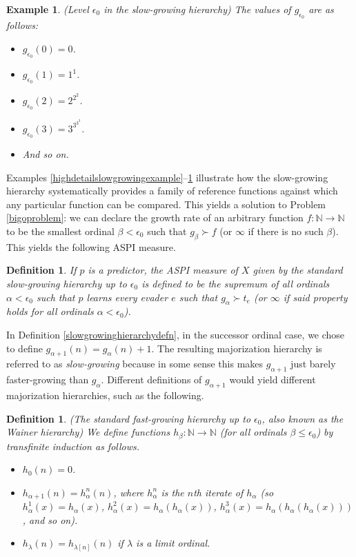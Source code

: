 \documentclass{article}
\newtheorem{definition}[theorem]{Definition}
\newtheorem{example}[theorem]{Example}
\begin{document}
\begin{example}
\label{epsilon0example}
(Level $\epsilon_0$ in the slow-growing hierarchy)
The values of $g_{\epsilon_0}$ are as follows:
\begin{itemize}
    \item
    $g_{\epsilon_0}(0)=0$.
    \item
    $g_{\epsilon_0}(1)=1^1$.
    \item
    $g_{\epsilon_0}(2)=2^{2^2}$.
    \item
    $g_{\epsilon_0}(3)=3^{3^{3^3}}$.
    \item
    And so on.
\end{itemize}
\end{example}

Examples \ref{highdetailslowgrowingexample}--\ref{epsilon0example} illustrate
how the slow-growing hierarchy systematically provides a family of reference
functions against which any particular function can be compared.
This yields a solution to Problem \ref{bigoproblem}: we can declare the growth
rate of an arbitrary function $f:\mathbb N\to\mathbb N$ to be the smallest ordinal
$\beta< \epsilon_0$ such that $g_\beta\succ f$ (or $\infty$ if there is no such
$\beta$). This yields the following ASPI measure.

\begin{definition}
\label{tradmajorizationhierarchyhibbardmeasuredefn}
    If $p$ is a predictor, the \emph{ASPI measure of $X$ given by the
    standard slow-growing hierarchy up to $\epsilon_0$} is defined to be the
    supremum of all ordinals $\alpha<\epsilon_0$ such that
    $p$ learns every evader $e$ such that $g_\alpha\succ t_e$ (or
    $\infty$ if said property holds for all ordinals $\alpha<\epsilon_0$).
\end{definition}

In Definition \ref{slowgrowinghierarchydefn}, in the successor ordinal case,
we chose to define $g_{\alpha+1}(n)=g_\alpha(n)+1$. The resulting majorization
hierarchy is referred to as \emph{slow-growing} because in some sense this
makes $g_{\alpha+1}$ just barely faster-growing than $g_\alpha$.
Different definitions of $g_{\alpha+1}$ would yield different majorization
hierarchies, such as the following.

\begin{definition}
\label{fastgrowinghierarchydefn}
    (The standard fast-growing hierarchy up to $\epsilon_0$, also known as
    the Wainer hierarchy)
    We define functions $h_\beta:\mathbb N\to\mathbb N$ (for all ordinals
    $\beta\leq \epsilon_0$) by transfinite induction as follows.
    \begin{itemize}
        \item
        $h_0(n)=0$.
        \item
        $h_{\alpha+1}(n) = h^n_\alpha(n)$, where $h^n_\alpha$ is the $n$th
        iterate of $h_\alpha$ (so $h^1_\alpha(x)=h_\alpha(x)$,
        $h^2_\alpha(x)=h_\alpha(h_\alpha(x))$,
        $h^3_\alpha(x)=h_\alpha(h_\alpha(h_\alpha(x)))$, and so on).
        \item
        $h_{\lambda}(n) = h_{\lambda[n]}(n)$ if $\lambda$ is a limit ordinal.
    \end{itemize}
\end{definition}
\end{document}
